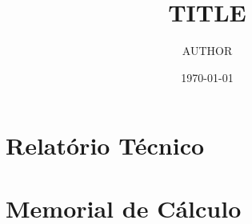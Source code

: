 \documentclass[12pt, a4paper, twoside]{report}
\title{TITLE}
\author{AUTHOR}
\date{\today}
\begin{document}

\newpage
\thispagestyle{empty}
\mbox{} 
\newpage 
{}
\begingroup
  \let\clearpage\relax %
  \tableofcontents
  \vspace*{30pt}
  \listoffigures
  \vspace*{30pt}
  \listoftables
\endgroup
\cleardoublepage

\part{Relatório Técnico} \label{part:relatório_técnico}

\part{Memorial de Cálculo} \label{part:memorial_de_calculo}



\printbibliography


\end{document}
